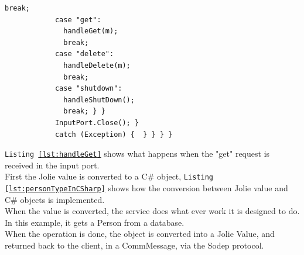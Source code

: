 \documentclass[12pt,a4paper]{article}
\begin{document}
\begin{lstlisting}[caption={C\# service start method},label={lst:winServiceSwitch}]
              break;                                                                                                                                                                   
            case "get":                                                                                                                                                                      
              handleGet(m);                                                                                                                                                                
              break;                                                                                                                                                                       
            case "delete":                                                                                                                                                                   
              handleDelete(m);                                                                                                                                                             
              break;                                                                                                                                                                       
            case "shutdown":                                                                                                                                                             
              handleShutDown();                                                                                                                                                        
              break; } }                                                                                                                                                                                    
            InputPort.Close(); }                                                                                                                                                                                        
            catch (Exception) {  } } } }
\end{lstlisting}

\texttt{Listing \ref{lst:handleGet}} shows what happens when the "get" request is received in the input port.\\
First the Jolie value is converted to a C\# object, \texttt{Listing \ref{lst:personTypeInCSharp}} shows how the conversion between Jolie value and C\# objects is implemented.\\
When the value is converted, the service does what ever work it is designed to do. In this example, it gets a Person from a database. \\
When the operation is done, the object is converted into a Jolie Value, and returned back to the client, in a CommMessage, via the Sodep protocol.
\end{document}
